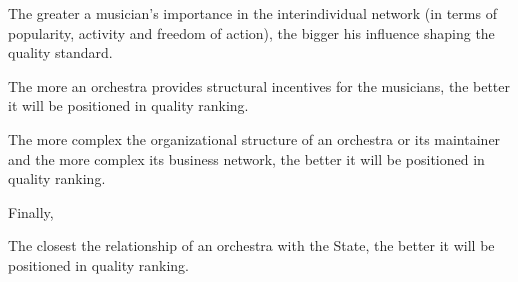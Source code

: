 \documentclass[a4paper, 12pt, openright, oneside, german, french, brazil, english]{abntex2}
\begin{document}
	\begin{hip}
		The greater a musician's importance in the interindividual network (in terms of popularity, activity and freedom of action), the bigger his influence shaping the quality standard.
	\end{hip}
	
	
	
	\begin{hip}
		The more an orchestra provides structural incentives for the musicians, the better it will be positioned in quality ranking.
	\end{hip}
	
		
	\begin{hip}
		The more complex the organizational structure of an orchestra or its maintainer and the more complex its business network, the better it will be positioned in quality ranking.
	\end{hip}
	
	Finally,
	
	\begin{hip}
	The closest the relationship of an orchestra with the State, the better it will be positioned in quality ranking.
	\end{hip}
	
	
\end{document}

